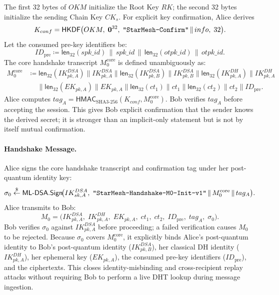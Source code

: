 \documentclass[11pt,a4paper]{article}
\theoremstyle{remark}
\theoremstyle{plain}
\newcommand{\getsr}{\stackrel{\$}{\leftarrow}}
\newcommand{\MLDSA}{\mathsf{ML\text{-}DSA}}
\newcommand{\HKDF}{\mathsf{HKDF}}
\newcommand{\Sign}{\mathsf{Sign}}
\newcommand{\HMAC}{\mathsf{HMAC}}
\newcommand{\flen}[1]{\mathsf{len}_{32}(#1)}
\newcommand{\strlit}[1]{\text{\upshape\texttt{"#1"}}}
\begin{document}
The first 32 bytes of $OKM$ initialize the Root Key $RK$; the second 32 bytes initialize the
sending Chain Key $CK_s$.
For explicit key confirmation, Alice derives
\[
      K_{conf} = \HKDF\bigl(OKM,\; \mathbf{0}^{32},\;
                            \strlit{StarMesh-Confirm} \,\|\, info,\; 32\bigr).
\]
Let the consumed pre-key identifiers be:
\[
  ID_{\mathrm{pre}} \coloneqq \flen{spk\_id} \,\|\, spk\_id \,\|\, \flen{otpk\_id} \,\|\, otpk\_id.
\]
The core handshake transcript $M_0^{\mathrm{core}}$ is defined unambiguously as:
\begin{align*}
  M_0^{\mathrm{core}} &\coloneqq \flen{IK^{DSA}_{pk,A}} \| IK^{DSA}_{pk,A}
                        \| \flen{IK^{DSA}_{pk,B}} \| IK^{DSA}_{pk,B}
                        \| \flen{IK^{DH}_{pk,A}} \| IK^{DH}_{pk,A} \\
                      &\quad\;\| \flen{EK_{pk,A}} \| EK_{pk,A}
                        \| \flen{ct_1} \| ct_1
                        \| \flen{ct_2} \| ct_2
                        \| ID_{\mathrm{pre}}.
\end{align*}
Alice computes $tag_A = \HMAC_{\mathrm{SHA3\text{-}256}}(K_{conf}, M_0^{\mathrm{core}})$. Bob verifies $tag_A$ before
accepting the session. This gives Bob explicit confirmation that the sender knows the derived
secret; it is stronger than an implicit-only statement but is not by itself mutual
confirmation.

\paragraph{Handshake Message.}
Alice signs the core handshake transcript and confirmation tag under her post-quantum identity key:
\[
  \sigma_0 \getsr \MLDSA.\Sign\!\bigl(IK^{DSA}_{sk,A},\;
      \strlit{StarMesh-Handshake-M0-Init-v1} \,\|\, M_0^{\mathrm{core}} \,\|\, tag_A\bigr).
\]
Alice transmits to Bob:
\[
      M_0 = \bigl(IK^{DSA}_{pk,A},\; IK^{DH}_{pk,A},\; EK_{pk,A},\; ct_1,\; ct_2,\;
                 ID_{\mathrm{pre}},\; tag_A,\; \sigma_0\bigr).
\]
Bob verifies $\sigma_0$ against $IK^{DSA}_{pk,A}$ before proceeding; a failed
verification causes $M_0$ to be rejected.  Because $\sigma_0$ covers $M_0^{\mathrm{core}}$, it
explicitly binds Alice's post-quantum identity to Bob's post-quantum identity ($IK^{DSA}_{pk,B}$),
her classical DH identity ($IK^{DH}_{pk,A}$), her ephemeral key ($EK_{pk,A}$), the consumed pre-key
identifiers ($ID_{\mathrm{pre}}$), and the ciphertexts.  This closes identity-misbinding and cross-recipient
replay attacks without requiring Bob to perform a live DHT lookup during message ingestion.
\end{document}
